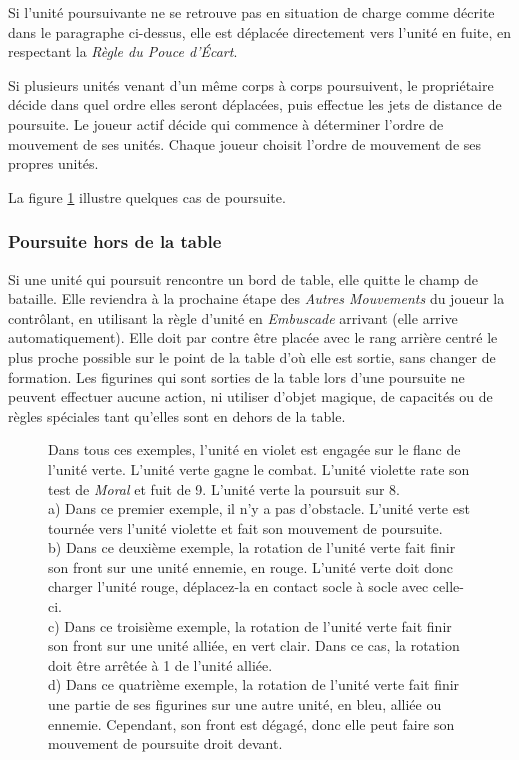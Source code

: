 Si l'unité poursuivante ne se retrouve pas en situation de charge comme décrite dans le paragraphe ci-dessus, elle est déplacée directement vers l'unité en fuite, en respectant la \emph{Règle du Pouce d'Écart}. 

Si plusieurs unités venant d'un même corps à corps poursuivent, le propriétaire décide dans quel ordre elles seront déplacées, puis effectue les jets de distance de poursuite. Le joueur actif décide qui commence à déterminer l'ordre de mouvement de ses unités. Chaque joueur choisit l'ordre de mouvement de ses propres unités.

La figure \ref{figure/poursuite} illustre quelques cas de poursuite.

\subsubsection*{Poursuite hors de la table}

Si une unité qui poursuit rencontre un bord de table, elle quitte le champ de bataille. Elle reviendra à la prochaine étape des \emph{Autres Mouvements} du joueur la contrôlant, en utilisant la règle d'unité en \emph{Embuscade} arrivant (elle arrive automatiquement). Elle doit par contre être placée avec le rang arrière centré le plus proche possible sur le point de la table d'où elle est sortie, sans changer de formation. Les figurines qui sont sorties de la table lors d'une poursuite ne peuvent effectuer aucune action, ni utiliser d'objet magique, de capacités ou de règles spéciales tant qu'elles sont en dehors de la table.


\begin{figure}[!htbp]
\centering
\def\svgwidth{7.7cm}

\caption{Dans tous ces exemples, l'unité en violet est engagée sur le flanc de l'unité verte. L'unité verte gagne le combat. L'unité violette rate son test de \emph{Moral} et fuit de 9{\pouce}. L'unité verte la poursuit sur 8{\pouce}. \\
a) Dans ce premier exemple, il n'y a pas d'obstacle. L'unité verte est tournée vers l'unité violette et fait son mouvement de poursuite. \\
b) Dans ce deuxième exemple, la rotation de l'unité verte fait finir son front sur une unité ennemie, en rouge. L'unité verte doit donc charger l'unité rouge, déplacez-la en contact socle à socle avec celle-ci. \\
c) Dans ce troisième exemple, la rotation de l'unité verte fait finir son front sur une unité alliée, en vert clair. Dans ce cas, la rotation doit être arrêtée à 1{\pouce} de l'unité alliée. \\
d) Dans ce quatrième exemple, la rotation de l'unité verte fait finir une partie de ses figurines sur une autre unité, en bleu, alliée ou ennemie. Cependant, son front est dégagé, donc elle peut faire son mouvement de poursuite droit devant.}
\label{figure/poursuite}
\end{figure}

